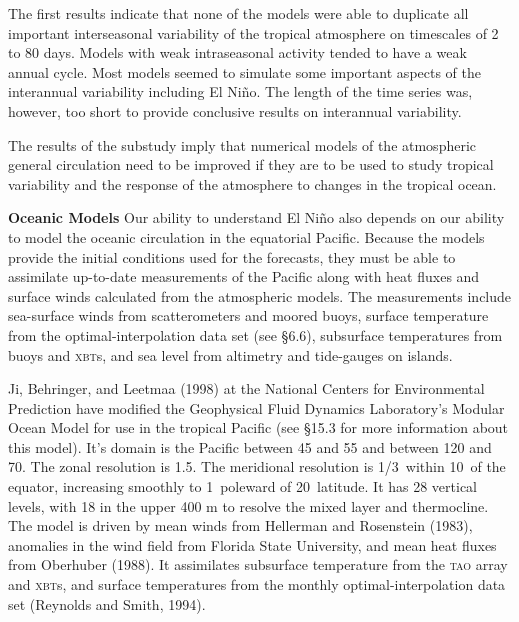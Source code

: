 The first results indicate that none of the models were able to duplicate all
important interseasonal variability of the tropical atmosphere on timescales of
2 to 80 days. Models with weak intraseasonal activity tended to have a weak
annual cycle. Most models seemed to simulate some important aspects of the
interannual variability including El Ni\~{n}o. The length of the time series
was, however, too short to provide conclusive results on interannual
variability.

The results of the substudy imply that numerical models of the atmospheric
general circulation need to be improved if they are to be used to study tropical
variability and the response of the atmosphere to changes in the tropical ocean.

\textbf{Oceanic Models} Our ability to understand El Ni\~{n}o also depends on our ability to model the oceanic circulation in the
equatorial Pacific. Because the models provide the initial conditions used for the forecasts,
they must be able to assimilate up-to-date measurements of the Pacific along with heat
fluxes and surface winds calculated from the atmospheric models. The
measurements include sea-surface winds from
scatterometers and moored buoys, surface
temperature from the optimal-interpolation data set (see \S6.6), subsurface temperatures from
buoys and \textsc{xbt}s, and sea level from altimetry and tide-gauges on islands.

Ji, Behringer, and Leetmaa (1998) at the National Centers for Environmental Prediction have modified the Geophysical Fluid Dynamics Laboratory's Modular Ocean Model for use in the tropical Pacific (see \S15.3 for more information about this model). It's domain is the Pacific between 45 and 55 and between 120 and 70. The zonal resolution is 1.5\degrees . The meridional resolution is {\footnotesize 1/3}\degrees\ within 10\degrees\ of the equator, increasing smoothly to 1\degrees\ poleward of 20\degrees\ latitude. It has 28 vertical levels, with 18 in the upper 400 m to resolve the mixed layer and thermocline. The model is driven by mean winds from Hellerman and Rosenstein (1983), anomalies in the wind field from Florida State University, and mean heat fluxes from Oberhuber (1988). It assimilates subsurface temperature from the \textsc{tao} array and \textsc{xbt}s, and surface temperatures from the monthly optimal-interpolation data set (Reynolds and Smith, 1994).

